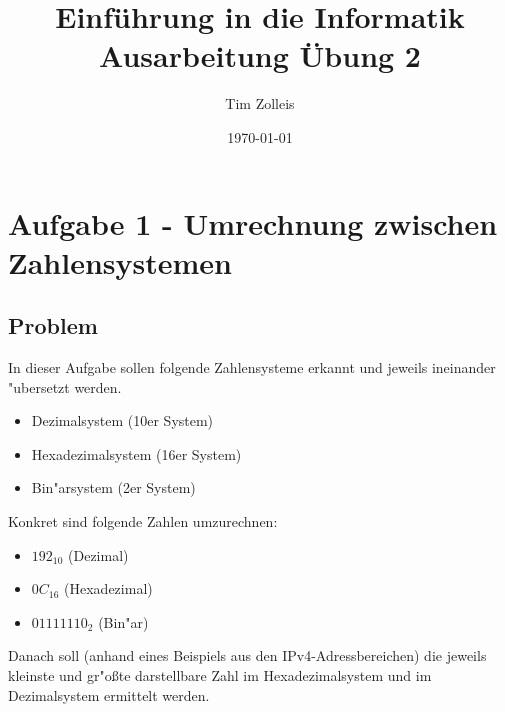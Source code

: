 \documentclass[a4paper,11pt,titlepage]{article}
\begin{document}
    \title{Einf\"uhrung in die Informatik\\
    Ausarbeitung \"Ubung 2}


    \author{Tim Zolleis}


    \date{\today}

    \maketitle{\thispagestyle{plain}}


    \section{Aufgabe 1 - Umrechnung zwischen Zahlensystemen}

    \subsection{Problem}
    In dieser Aufgabe sollen folgende Zahlensysteme erkannt und jeweils ineinander "ubersetzt werden.

    \begin{itemize}
        \item Dezimalsystem (10er System)
        \item Hexadezimalsystem (16er System)
        \item Bin"arsystem (2er System)
    \end{itemize}

    Konkret sind folgende Zahlen umzurechnen:

    \begin{itemize}
        \item $192_10$ (Dezimal)
        \item $0C_{16}$ (Hexadezimal)
        \item $01111110_2$ (Bin"ar)
    \end{itemize}



    Danach soll (anhand eines Beispiels aus den IPv4-Adressbereichen) die jeweils kleinste und gr"oßte darstellbare Zahl im Hexadezimalsystem und im Dezimalsystem ermittelt werden.
\end{document}
